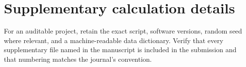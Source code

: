 \section{Supplementary calculation details}

For an auditable project, retain the exact script, software versions, random
seed where relevant, and a machine-readable data dictionary. Verify that every
supplementary file named in the manuscript is included in the submission and
that numbering matches the journal's convention.
